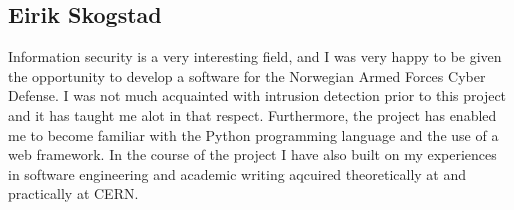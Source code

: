 \subsection{Eirik Skogstad}
Information security is a very interesting field, and I was very happy to be
given the opportunity to develop a software for the Norwegian Armed Forces
Cyber Defense. I was not much acquainted with intrusion detection prior to
this project and it has taught me alot in that respect. Furthermore, the
project has enabled me to become familiar with the Python programming language
and the use of a web framework. In the course of the project I have also built
on my experiences in software engineering and academic writing aqcuired
theoretically at \GUC{} and practically at CERN.
